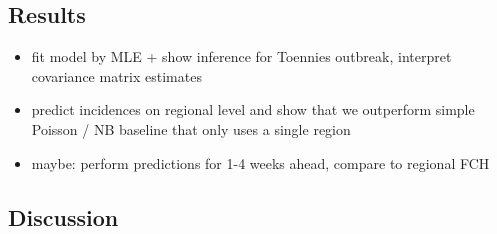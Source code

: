 \subsection{Results}

\begin{itemize}
    \item fit model by MLE + show inference for Toennies outbreak, interpret covariance matrix estimates
    \item predict incidences on regional level and show that we outperform simple Poisson / NB baseline that only uses a single region
    \item maybe: perform predictions for 1-4 weeks ahead, compare to regional FCH
\end{itemize}

\subsection{Discussion}

